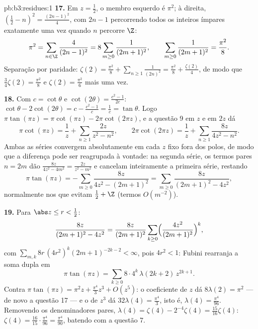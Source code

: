 \begin{solution}{pb:b3:residues:1}
\textbf{17.} Em $z = \frac12$, o membro esquerdo é $\pi^2$; à
direita, $(\frac12 - n)^2 = \frac{(2n-1)^2}4$, com $2n -
1$ percorrendo todos os inteiros ímpares exatamente uma vez quando $n$ percorre
$\Z$:
\[
\pi^2 = \sum_{n\in\Z}\frac{4}{(2n-1)^2}
= 8\sum_{m\geq0}\frac1{(2m+1)^2},
\qquad
\sum_{m\geq0}\frac1{(2m+1)^2} = \frac{\pi^2}8 .
\]
Separação por paridade: $\zeta(2) = \frac{\pi^2}8 +
\sum_{n\geq1}\frac1{(2n)^2} = \frac{\pi^2}8 +
\frac{\zeta(2)}4$, de modo que $\frac34\zeta(2) = \frac{\pi^2}8$ e
$\zeta(2) = \frac{\pi^2}6$ mais uma vez.

\textbf{18.} Com $c = \cot\theta$ e $\cot(2\theta) =
\frac{c^2-1}{2c}$: $\cot\theta - 2\cot(2\theta) = c -
\frac{c^2-1}c = \frac1c = \tan\theta$. Logo $\pi\tan(\pi z)
= \pi\cot(\pi z) - 2\pi\cot(2\pi z)$, e a questão 9 em $z$
e em $2z$ dá
\[
\pi\cot(\pi z) = \frac1z +
\sum_{n\geq1}\frac{2z}{z^2 - n^2},
\qquad
2\pi\cot(2\pi z) = \frac1z +
\sum_{n\geq1}\frac{8z}{4z^2 - n^2} .
\]
Ambas as séries convergem absolutamente em cada $z$ fixo fora dos
polos, de modo que a diferença pode ser reagrupada à vontade: na
segunda série, os termos pares $n = 2m$ dão $\frac{8z}{4z^2 -
4m^2} = \frac{2z}{z^2 - m^2}$ e cancelam inteiramente a primeira série,
restando
\[
\pi\tan(\pi z) = -\sum_{m\geq0}\frac{8z}{4z^2 - (2m+1)^2}
= \sum_{m\geq0}\frac{8z}{(2m+1)^2 - 4z^2} ,
\]
normalmente nos  que evitam $\frac12 + \Z$ (termos
$O(m^{-2})$).

\textbf{19.} Para $\abs z \leq r < \frac12$:
\[
\frac{8z}{(2m+1)^2 - 4z^2} = \frac{8z}{(2m+1)^2}
\sum_{k\geq0}\Bigl(\frac{4z^2}{(2m+1)^2}\Bigr)^{k},
\]
com $\sum_{m,k}8r\,(4r^2)^k(2m+1)^{-2k-2} < \infty$, pois
$4r^2 < 1$: Fubini rearranja a soma dupla em
\[
\pi\tan(\pi z) =
\sum_{k\geq0}8\cdot4^k\,\lambda(2k+2)\,z^{2k+1} .
\]
Contra $\pi\tan(\pi z) = \pi^2z + \frac{\pi^4}3z^3 +
O(z^5)$: o coeficiente de $z$ dá $8\lambda(2) = \pi^2$
--- de novo a questão 17 --- e o de $z^3$ dá
$32\lambda(4) = \frac{\pi^4}3$, isto é, $\lambda(4) =
\frac{\pi^4}{96}$. Removendo os denominadores pares,
$\lambda(4) = \zeta(4) - 2^{-4}\zeta(4) =
\frac{15}{16}\zeta(4)$: $\zeta(4) = \frac{16}{15}\cdot
\frac{\pi^4}{96} = \frac{\pi^4}{90}$, batendo com a questão 7.


\end{solution}
